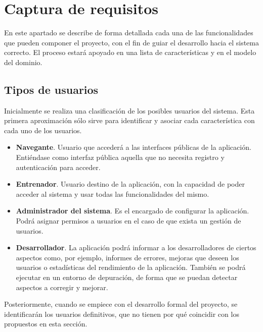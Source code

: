 
\chapter{Captura de requisitos} %
\label{cha:captura_de_requisitos}
	
	En este apartado se describe de forma detallada cada una de las funcionalidades que pueden componer el proyecto, con el fin de guiar el desarrollo hacia el sistema correcto. El proceso estará apoyado en una lista de características y en el modelo del dominio.

% 
%
\section{Tipos de usuarios} %
	\label{sec:tipos_de_usuarios}
	
	Inicialmente se realiza una clasificación de los posibles usuarios del sistema. Esta primera aproximación sólo sirve para identificar y asociar cada característica con cada uno de los usuarios.

	\begin{itemize}
		\item {{\bf Navegante}. Usuario que accederá a las interfaces públicas de la aplicación. Entiéndase como interfaz pública aquella que no necesita registro y autenticación para acceder.}
		\item {{\bf Entrenador}. Usuario destino de la aplicación, con la capacidad de poder acceder al sistema y usar todas las funcionalidades del mismo.}
		\item {{\bf Administrador del sistema}. Es el encargado de configurar la aplicación. Podrá asignar permisos a usuarios en el caso de que exista un gestión de usuarios.}
		\item {{\bf Desarrollador}. La aplicación podrá informar a los desarrolladores de ciertos aspectos como, por ejemplo, informes de errores, mejoras que deseen los usuarios o estadísticas del rendimiento de la aplicación. También se podrá ejecutar en un entorno de depuración, de forma que se puedan detectar aspectos a corregir y mejorar.}
	\end{itemize}

	Posteriormente, cuando se empiece con el desarrollo formal del proyecto, se identificarán los usuarios definitivos, que no tienen por qué coincidir con los propuestos en esta sección.
	
